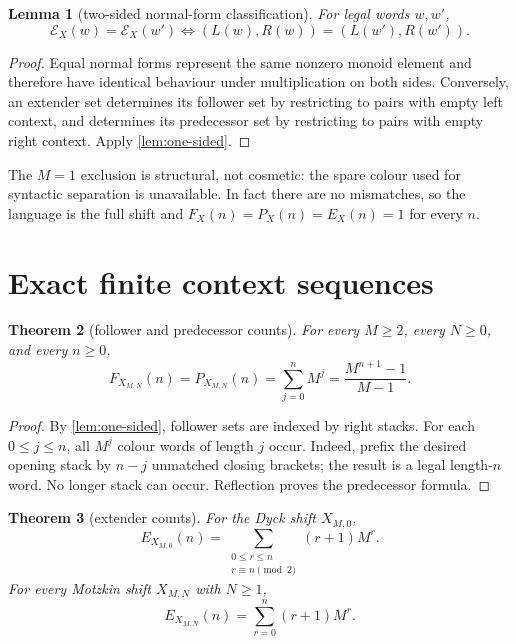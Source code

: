 \documentclass[11pt,a4paper]{amsart}
\newtheorem{theorem}{Theorem}[section]
\newtheorem{lemma}[theorem]{Lemma}
\theoremstyle{definition}
\theoremstyle{remark}
\newcommand{\cE}{\mathcal E}
\begin{document}
\begin{lemma}[two-sided normal-form classification]\label{lem:extender}
For legal words $w,w'$,
\[
 \cE_X(w)=\cE_X(w')
 \iff (L(w),R(w))=(L(w'),R(w')).
\]
\end{lemma}

\begin{proof}
Equal normal forms represent the same nonzero monoid element and therefore
have identical behaviour under multiplication on both sides.  Conversely,
an extender set determines its follower set by restricting to pairs with
empty left context, and determines its predecessor set by restricting to
pairs with empty right context.  Apply \cref{lem:one-sided}.
\end{proof}

The $M=1$ exclusion is structural, not cosmetic: the spare colour used for
syntactic separation is unavailable.  In fact there are no mismatches, so the
language is the full shift and $F_X(n)=P_X(n)=E_X(n)=1$ for every $n$.

\section{Exact finite context sequences}

\begin{theorem}[follower and predecessor counts]\label{thm:one-sided-count}
For every $M\geq2$, every $N\geq0$, and every $n\geq0$,
\begin{equation}\label{eq:fp}
 F_{X_{M,N}}(n)=P_{X_{M,N}}(n)
 =\sum_{j=0}^nM^j=\frac{M^{n+1}-1}{M-1}.
\end{equation}
\end{theorem}

\begin{proof}
By \cref{lem:one-sided}, follower sets are indexed by right stacks.  For each
$0\leq j\leq n$, all $M^j$ colour words of length $j$ occur.  Indeed, prefix
the desired opening stack by $n-j$ unmatched closing brackets; the result is
a legal length-$n$ word.  No longer stack can occur.  Reflection proves the
predecessor formula.
\end{proof}

\begin{theorem}[extender counts]\label{thm:extender-count}
For the Dyck shift $X_{M,0}$,
\begin{equation}\label{eq:dyck-extender}
 E_{X_{M,0}}(n)=
 \sum_{\substack{0\leq r\leq n\\r\equiv n\pmod2}}(r+1)M^r.
\end{equation}
For every Motzkin shift $X_{M,N}$ with $N\geq1$,
\begin{equation}\label{eq:motzkin-extender}
 E_{X_{M,N}}(n)=\sum_{r=0}^n(r+1)M^r.
\end{equation}
\end{theorem}
\end{document}
